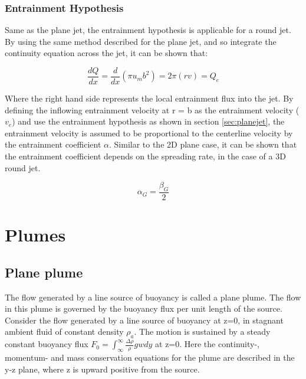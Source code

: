 \subsubsection{Entrainment Hypothesis} 
Same as the plane jet, the entrainment hypothesis is applicable for a round jet. By using the same method described for the plane jet, and so integrate the continuity equation across the jet, it can be shown that:

\begin{equation}
    \frac{dQ}{dx} = \frac{d}{dx} (\pi u_m b^2) = 2\pi(rv) = Q_e
\end{equation} \newline

\noindent Where the right hand side represents the local entrainment flux into the jet. By defining the inflowing entrainment velocity at r = b as the entrainment velocity ($v_e$) and use the entrainment hypothesis as shown in section \ref{sec:planejet}, the entrainment velocity is assumed to be proportional to the centerline velocity by the entrainment coefficient $\alpha$. Similar to the 2D plane case, it can be shown that the entrainment coefficient depends on the spreading rate, in the case of a 3D round jet.

\begin{equation}
    \alpha_G = \frac{\beta_G}{2}
\end{equation}







\section{Plumes}

\subsection{Plane plume}
\noindent The flow generated by a line source of buoyancy is called a plane plume. The flow in this plume is governed by the buoyancy flux per unit length of the source.  Consider the flow generated by a line source of buoyancy at z=0, in stagnant ambient fluid of constant density $\rho_a$. The motion is sustained by a steady constant buoyancy flux $F_0 = \int_\infty^\infty \frac{\Delta \rho}{\rho} gw dy$ at z=0. Here the continuity-, momentum- and mass conservation equations for the plume are described in the y-z plane, where z is upward positive from the source.

